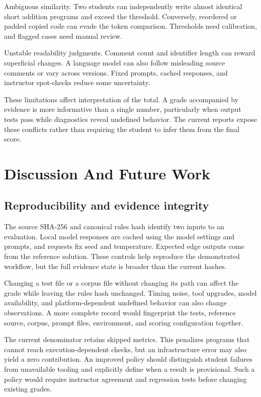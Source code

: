 \documentclass[conference]{IEEEtran}
\begin{document}
Ambiguous similarity. Two students can independently write almost identical short addition programs and exceed the threshold. Conversely, reordered or padded copied code can evade the token comparison. Thresholds need calibration, and flagged cases need manual review.


Unstable readability judgments. Comment count and identifier length can reward superficial changes. A language model can also follow misleading source comments or vary across versions. Fixed prompts, cached responses, and instructor spot-checks reduce some uncertainty.


These limitations affect interpretation of the total. A grade accompanied by evidence is more informative than a single number, particularly when output tests pass while diagnostics reveal undefined behavior. The current reports expose these conflicts rather than requiring the student to infer them from the final score.


\newpage

\section{Discussion And Future Work}

\subsection{Reproducibility and evidence integrity}

The source SHA-256 and canonical rules hash identify two inputs to an evaluation. Local model responses are cached using the model settings and prompts, and requests fix seed and temperature. Expected edge outputs come from the reference solution. These controls help reproduce the demonstrated workflow, but the full evidence state is broader than the current hashes.


Changing a test file or a corpus file without changing its path can affect the grade while leaving the rules hash unchanged. Timing noise, tool upgrades, model availability, and platform-dependent undefined behavior can also change observations. A more complete record would fingerprint the tests, reference source, corpus, prompt files, environment, and scoring configuration together.


The current denominator retains skipped metrics. This penalizes programs that cannot reach execution-dependent checks, but an infrastructure error may also yield a zero contribution. An improved policy should distinguish student failures from unavailable tooling and explicitly define when a result is provisional. Such a policy would require instructor agreement and regression tests before changing existing grades.
\end{document}
